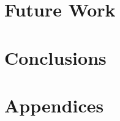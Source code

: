 \documentclass[12pt]{report}
\begin{document}
\chapter{Future Work}


\chapter{Conclusions}








\chapter{Appendices}

\end{document}
